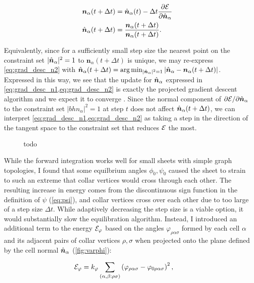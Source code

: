 \begin{align}
	\bm{n}_\alpha(t+\Delta t) &= \hat{\bm{n}}_\alpha(t) - \Delta t \frac{\partial \mathcal{E}}{\partial \hat{\bm{n}}_\alpha} \label{eq:grad_desc_n1}\\
	\hat{\bm{n}}_\alpha(t+\Delta t) &= \frac{\bm{n}_\alpha(t+\Delta t)}{\bm{n}_\alpha(t+\Delta t)}. \label{eq:grad_desc_n2}
\end{align}

Equivalently, since for a sufficiently small step size the nearest point on the constraint set $|\hat{\bm{n}}_\alpha|^2=1$ to $\bm{n}_\alpha(t+\Delta t)$ is unique, we may re-express \cref{eq:grad_desc_n2} with $\hat{\bm{n}}_\alpha(t + \Delta t) = \arg \min_{|\hat{\bm{n}}_\alpha|^2 = 1} |\hat{\bm{n}}_\alpha - \bm{n}_\alpha(t+\Delta t)|$.
Expressed in this way, we see that the update for $\hat{\bm{n}}_\alpha$ expressed in \cref{eq:grad_desc_n1,eq:grad_desc_n2} is exactly the projected gradient descent algorithm and we expect it to converge \citep{eicke1992}.
Since the normal component of $\partial \mathcal{E} / \partial \hat{\bm{n}}_\alpha$ to the constraint set $|bh{n}_\alpha|^2 = 1$ at step $t$ does not affect $\hat{\bm{n}}_\alpha(t + \Delta t)$, we can interpret \cref{eq:grad_desc_n1,eq:grad_desc_n2} as taking a step in the direction of the tangent space to the constraint set that reduces $\mathcal{E}$ the most.


\begin{figure}
	\caption{todo}
	\label{fig:dynamics}
\end{figure}

While the forward integration works well for small sheets with simple graph topologies, I found that some equilbrium angles $\phi_0, \psi_0$ caused the sheet to strain to such an extreme that collar vertices would cross through each other. 
The resulting increase in energy comes from the discontinuous sign function in the definition of $\psi$ (\cref{eq:psi}), and collar vertices cross over each other due to too large of a step size $\Delta t$. 
While adaptively decreasing the step size is a viable option, it would substantially slow the equilibration algorithm.  
Instead, I introduced an additional term to the energy $\mathcal{E}_\varphi$ based on the angles $\varphi_{\rho\alpha\sigma}$ formed by each cell $\alpha$ and its adjacent pairs of collar vertices $\rho,\sigma$ when projected onto the plane defined by the cell normal $\hat{\bm{n}}_\alpha$ (\cref{fig:varphi}):

\begin{align}
	\mathcal{E}_\varphi &= k_\varphi \sum_{(\alpha,\beta:\rho\sigma)} \left(\varphi_{\rho\alpha\sigma} - \varphi_{0\rho\alpha\sigma} \right)^2, \label{eq:e_varphi}
\end{align}

